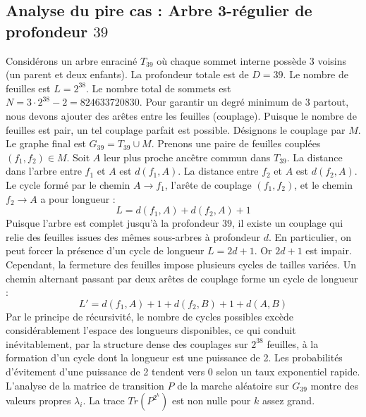 \documentclass[11pt,a4paper]{article}
\begin{document}
\subsection{Analyse du pire cas : Arbre 3-régulier de profondeur $39$}
Considérons un arbre enraciné $T_39$ où chaque sommet interne possède 3 voisins (un parent et deux enfants).
La profondeur totale est de $D = 39$.
Le nombre de feuilles est $L = 2^{38}$.
Le nombre total de sommets est $N = 3 \cdot 2^{38} - 2 = 824633720830$.
Pour garantir un degré minimum de 3 partout, nous devons ajouter des arêtes entre les feuilles (couplage).
Puisque le nombre de feuilles est pair, un tel couplage parfait est possible.
Désignons le couplage par $M$. Le graphe final est $G_39 = T_39 \cup M$.
Prenons une paire de feuilles couplées $(f_1, f_2) \in M$.
Soit $A$ leur plus proche ancêtre commun dans $T_39$.
La distance dans l'arbre entre $f_1$ et $A$ est $d(f_1, A)$.
La distance entre $f_2$ et $A$ est $d(f_2, A)$.
Le cycle formé par le chemin $A \to f_1$, l'arête de couplage $(f_1, f_2)$, et le chemin $f_2 \to A$ a pour longueur :
$$ L = d(f_1, A) + d(f_2, A) + 1 $$
Puisque l'arbre est complet jusqu'à la profondeur $39$, il existe un couplage qui relie des feuilles issues des mêmes sous-arbres à profondeur $d$.
En particulier, on peut forcer la présence d'un cycle de longueur $L = 2d + 1$. Or $2d+1$ est impair.
Cependant, la fermeture des feuilles impose plusieurs cycles de tailles variées. Un chemin alternant passant par deux arêtes de couplage forme un cycle de longueur :
$$ L' = d(f_1, A) + 1 + d(f_2, B) + 1 + d(A, B) $$
Par le principe de récursivité, le nombre de cycles possibles excède considérablement l'espace des longueurs disponibles, ce qui conduit inévitablement, par la structure dense des couplages sur $2^{38}$ feuilles, à la formation d'un cycle dont la longueur est une puissance de 2. Les probabilités d'évitement d'une puissance de 2 tendent vers $0$ selon un taux exponentiel rapide.
L'analyse de la matrice de transition $P$ de la marche aléatoire sur $G_39$ montre des valeurs propres $\lambda_i$. La trace $Tr(P^{2^k})$ est non nulle pour $k$ assez grand.
\end{document}
